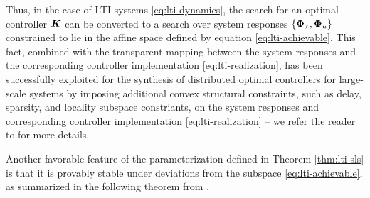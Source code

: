 Thus, in the case of LTI systems \eqref{eq:lti-dynamics}, the search for an optimal controller $\boldsymbol{K}$ can be converted to a search over system responses $\left\{\boldsymbol{\Phi}_x,\boldsymbol{\Phi}_u\right\}$ constrained to lie in the affine space defined by equation \eqref{eq:lti-achievable}.  This fact, combined with the transparent mapping between the system responses and the corresponding controller implementation \eqref{eq:lti-realization}, has been successfully exploited for the synthesis of distributed optimal controllers for large-scale systems by imposing additional convex structural constraints, such as delay, sparsity, and locality subspace constriants, on the system responses and corresponding controller implementation \eqref{eq:lti-realization} -- we refer the reader to \cite{wang2014localized,wang2016localized,wang2018separable} for more details.

Another favorable feature of the parameterization defined in Theorem \ref{thm:lti-sls} is that it is provably stable under deviations from the subspace \eqref{eq:lti-achievable}, as summarized in the following theorem from \cite{matni2017scalable}.

